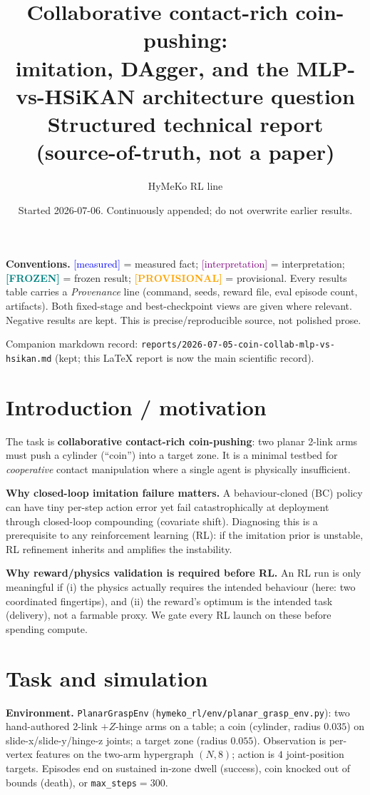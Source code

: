 \documentclass[11pt]{article}
\title{\textbf{Collaborative contact-rich coin-pushing:\\
imitation, DAgger, and the MLP-vs-HSiKAN architecture question}\\[4pt]
\large Structured technical report (source-of-truth, not a paper)}
\author{HyMeKo RL line}
\date{Started 2026-07-06. Continuously appended; do not overwrite earlier results.}
\newcommand{\meas}{\textcolor{blue}{[measured]}}
\newcommand{\interp}{\textcolor{purple}{[interpretation]}}
\newcommand{\frozen}{\textcolor{teal}{\textbf{[FROZEN]}}}
\newcommand{\prov}{\textcolor{orange}{\textbf{[PROVISIONAL]}}}
\newcommand{\fn}[1]{\texttt{#1}}
\begin{document}
\maketitle

\noindent\textbf{Conventions.} \meas{} = measured fact; \interp{} = interpretation; \frozen{} = frozen result;
\prov{} = provisional. Every results table carries a \emph{Provenance} line (command, seeds, reward file, eval
episode count, artifacts). Both fixed-stage and best-checkpoint views are given where relevant. Negative results
are kept. This is precise/reproducible source, not polished prose.

Companion markdown record: \fn{reports/2026-07-05-coin-collab-mlp-vs-hsikan.md} (kept; this \LaTeX{} report is
now the main scientific record).

\section{Introduction / motivation}
The task is \textbf{collaborative contact-rich coin-pushing}: two planar 2-link arms must push a cylinder
(``coin'') into a target zone. It is a minimal testbed for \emph{cooperative} contact manipulation where a single
agent is physically insufficient.

\textbf{Why closed-loop imitation failure matters.} A behaviour-cloned (BC) policy can have tiny per-step action
error yet fail catastrophically at deployment through closed-loop compounding (covariate shift). Diagnosing this
is a prerequisite to any reinforcement learning (RL): if the imitation prior is unstable, RL refinement inherits
and amplifies the instability.

\textbf{Why reward/physics validation is required before RL.} An RL run is only meaningful if (i) the physics
actually requires the intended behaviour (here: two coordinated fingertips), and (ii) the reward's optimum is the
intended task (delivery), not a farmable proxy. We gate every RL launch on these before spending compute.

\section{Task and simulation}
\textbf{Environment.} \fn{PlanarGraspEnv} (\fn{hymeko\_rl/env/planar\_grasp\_env.py}): two hand-authored 2-link
$+Z$-hinge arms on a table; a coin (cylinder, radius $0.035$) on slide-x/slide-y/hinge-z joints; a target zone
(radius $0.055$). Observation is per-vertex features on the two-arm hypergraph $(N,8)$; action is $4$ joint-position
targets. Episodes end on sustained in-zone dwell (success), coin knocked out of bounds (death), or
\fn{max\_steps}$=300$.
\end{document}
